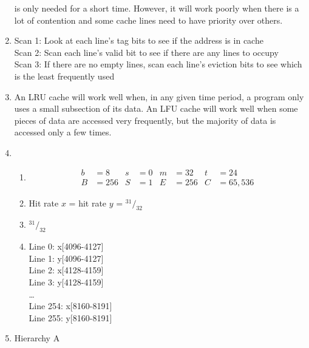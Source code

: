 \documentclass{article}
\begin{document}
\begin{enumerate}
    is only needed for a short time. However, it will work poorly when there is a lot of contention and some cache lines need to
    have priority over others.
    \item
      Scan 1: Look at each line's tag bits to see if the address is in cache \\
      Scan 2: Scan each line's valid bit to see if there are any lines to occupy \\
      Scan 3: If there are no empty lines, scan each line's eviction bits to see which is the least frequently used
    \item An LRU cache will work well when, in any given time period, a program only uses a small subsection of its data.
    An LFU cache will work well when some pieces of data are accessed very frequently, but the majority of
    data is accessed only a few times.
    \item
    \begin{enumerate}
      \item
      \begin{align*}
        b&=8 & s&=0  & m&=32 & t&=24 \\
        B&=256 & S&=1 & E&=256 & C&=65,536       
      \end{align*}
      \item
      Hit rate $x$ = hit rate $y$ = ${}^{31}/_{32}$
      \item
      ${}^{31}/_{32}$
      \item
      Line 0: x[4096-4127] \\
      Line 1: y[4096-4127] \\
      Line 2: x[4128-4159] \\
      Line 3: y[4128-4159] \\
      \ldots \\
      Line 254: x[8160-8191] \\
      Line 255: y[8160-8191]
    \end{enumerate}
    \item Hierarchy A
  \end{enumerate}
  
  
\end{document}
